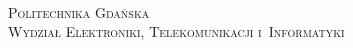 \begin{titlepage}
 
\begin{center}
 
 
\\[1cm]
 
\textsc{\LARGE Politechnika Gdańska}\\[1.5cm]
 
\textsc{\Large Wydział Elektroniki, Telekomunikacji i~Informatyki}\\[0.5cm]
 
 
\HRule \\[0.4cm]




\end{center}
\end{titlepage}
